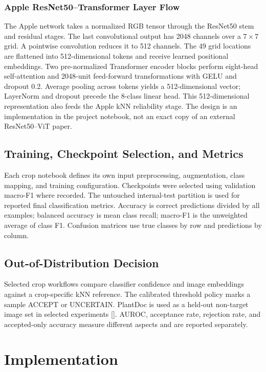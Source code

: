 \documentclass[12pt,a4paper,oneside]{report}
\begin{document}
\subsection{Apple ResNet50--Transformer Layer Flow}
The Apple network takes a normalized RGB tensor through the ResNet50 stem and residual stages. The last convolutional output has 2048 channels over a $7\times7$ grid. A pointwise convolution reduces it to 512 channels. The 49 grid locations are flattened into 512-dimensional tokens and receive learned positional embeddings. Two pre-normalized Transformer encoder blocks perform eight-head self-attention and 2048-unit feed-forward transformations with GELU and dropout 0.2. Average pooling across tokens yields a 512-dimensional vector; LayerNorm and dropout precede the 8-class linear head. This 512-dimensional representation also feeds the Apple kNN reliability stage. The design is an implementation in the project notebook, not an exact copy of an external ResNet50--ViT paper.
\section{Training, Checkpoint Selection, and Metrics}
Each crop notebook defines its own input preprocessing, augmentation, class mapping, and training configuration. Checkpoints were selected using validation macro-F1 where recorded. The untouched internal-test partition is used for reported final classification metrics. Accuracy is correct predictions divided by all examples; balanced accuracy is mean class recall; macro-F1 is the unweighted average of class F1. Confusion matrices use true classes by row and predictions by column.
\section{Out-of-Distribution Decision}
Selected crop workflows compare classifier confidence and image embeddings against a crop-specific kNN reference. The calibrated threshold policy marks a sample ACCEPT or UNCERTAIN. PlantDoc is used as a held-out non-target image set in selected experiments [\cite{singh2020}]. AUROC, acceptance rate, rejection rate, and accepted-only accuracy measure different aspects and are reported separately.

\chapter{Implementation}
\end{document}
